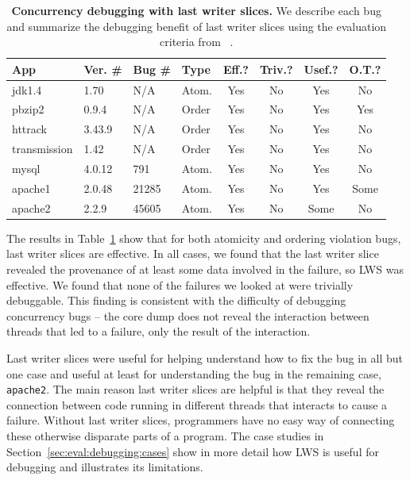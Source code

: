 \documentclass[pageno,nohyperref]{jpaper}
\newcommand{\lws}{LWS\xspace}
\newcommand{\Caption}[1]{\begin{minipage}{.95\columnwidth} \caption{#1} \end{minipage} \vspace{-1.2ex}}
\begin{document}
\begin{table}
\scriptsize
\centering
\begin{tabular}{l|ll|l|ccc|c}
{\bf App} & {\bf Ver. \#} & {\bf Bug \#} &{\bf Type} & {\bf Eff.?} & {\bf Triv.?} & {\bf Usef.?} & {\bf O.T.?}\\ \hline
jdk1.4 &  1.70   &  N/A     & Atom.  &Yes  &No    &Yes   & No  \\%
pbzip2 &  0.9.4  &  N/A     & Order  &Yes  &No    &Yes   & Yes \\
httrack& 3.43.9  &  N/A     & Order  &Yes  &No    &Yes   & No  \\%
transmission & 1.42 & N/A   & Order  &Yes  &No    &Yes   & No  \\
mysql  &  4.0.12 &  791     & Atom.  &Yes  &No    &Yes   & No  \\%
apache1&  2.0.48 &  21285   & Atom.  &Yes  &No    &Yes   & Some \\%
apache2&  2.2.9 &  45605    & Atom.  &Yes  &No    &Some  & No \\%
\end{tabular}
\Caption{\label{tab:bugs}{\bf Concurrency debugging with last writer slices.} We describe each bug and summarize the debugging benefit of last writer slices using the evaluation criteria from ~\cite{badapples}.  }
\normalsize
\end{table}

The results in Table~\ref{tab:bugs} show that for both atomicity and ordering
violation bugs, last writer slices are effective.  In all cases, we found that
the last writer slice revealed the provenance of at least some data involved in
the failure, so \lws was effective.  We found that none of the
failures we looked at were trivially debuggable.  This finding is consistent
with the difficulty of debugging concurrency bugs -- the core dump does not
reveal the interaction between threads that led to a failure, only the result
of the interaction.  

Last writer slices were useful for helping understand how to fix the bug in
all but one case and useful at least for understanding the bug in the
remaining case, {\tt apache2}.  The main reason last writer slices are helpful
is that they reveal the connection between code running in different threads
that interacts to cause a failure.  Without last writer slices, programmers
have no easy way of connecting these otherwise disparate parts of a program.
The case studies in Section~\ref{sec:eval:debugging:cases} show in more detail
how \lws is useful for debugging and illustrates its limitations.
\end{document}
